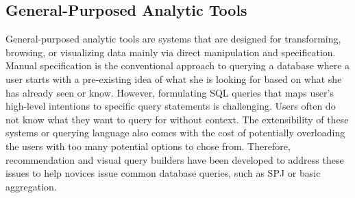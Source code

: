 \documentclass{sig-alternate-05-2015}
\begin{document}
\subsection{General-Purposed Analytic Tools} General-purposed analytic tools are systems that are designed for transforming, browsing, or visualizing data mainly via direct manipulation and specification. Manual specification is the conventional approach to querying a database where a user starts with a pre-existing idea of what she is looking for based on what she has already seen or know. However, formulating SQL queries that maps user's high-level intentions to specific query statements is challenging. Users often do not know what they want to query for without context. The extensibility of these systems or querying language also comes with the cost of potentially overloading the users with too many potential options to chose from. Therefore, recommendation and visual query builders have been developed to address these issues to help novices issue common database queries, such as SPJ or basic aggregation.
\end{document}
